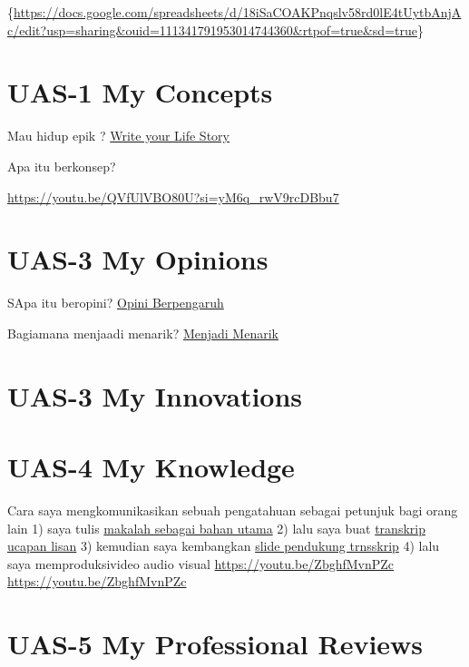 \documentclass[
  letterpaper,
  DIV=11,
  numbers=noendperiod]{scrreprt}
\begin{document}
\{\url{https://docs.google.com/spreadsheets/d/18iSaCOAKPnqslv58rd0lE4tUytbAnjAc/edit?usp=sharing&ouid=111341791953014744360&rtpof=true&sd=true}\}


\chapter{UAS-1 My Concepts}\label{uas-1-my-concepts}

Mau hidup epik ? \href{lifestory.pdf}{Write your Life Story}

Apa itu berkonsep?

\url{https://youtu.be/QVfUlVBO80U?si=yM6q_rwV9rcDBbu7}


\chapter{UAS-3 My Opinions}\label{uas-3-my-opinions}

SApa itu beropini? \href{BM\%20Opini.mp4}{Opini Berpengaruh}

Bagiamana menjaadi menarik? \href{./Interesting.mp4}{Menjadi Menarik}


\chapter{UAS-3 My Innovations}\label{uas-3-my-innovations}


\chapter{UAS-4 My Knowledge}\label{uas-4-my-knowledge}

Cara saya mengkomunikasikan sebuah pengatahuan sebagai petunjuk bagi
orang lain 1) saya tulis
\href{Rekomendasi\%20Presentasi\%20Efektif(Contoh\%20Makalah).pdf}{makalah
sebagai bahan utama} 2) lalu saya buat
\href{Contoh\%20Transkrip\%20Presentasi.pdf}{transkrip ucapan lisan} 3)
kemudian saya kembangkan
\href{Rekomendasi\%20Presentasi\%20(Contoh\%20Slides).pdf}{slide
pendukung trnsskrip} 4) lalu saya memproduksivideo audio visual
\url{https://youtu.be/ZbghfMvnPZc} \url{https://youtu.be/ZbghfMvnPZc}


\chapter{UAS-5 My Professional
Reviews}\label{uas-5-my-professional-reviews}
\end{document}
